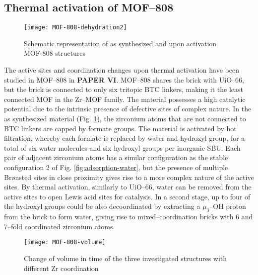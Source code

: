 \subsection*{Thermal activation of MOF--808}
\begin{figure}[!htbp]
	\centering
	\texttt{[image: MOF-808-dehydration2]}
	\caption{Schematic representation of as synthesized and upon activation MOF-808 structures}
	\label{fig:MOF-808-dehydration2}
\end{figure}
The active sites and coordination changes upon thermal activation have been studied in MOF--808 in \textbf{PAPER VI}. MOF--808 shares the  brick with UiO--66, but the brick is connected to only six tritopic BTC linkers, making it the least connected MOF in the Zr--MOF family. The material possesses a high catalytic potential due to the intrinsic presence of defective sites of complex nature. In the as synthesized material (Fig. \ref{fig:MOF-808-dehydration2}), the zirconium atoms that are not connected to BTC linkers are capped by formate groups. The material is activated by hot filtration, whereby each formate is replaced by water and hydroxyl group, for a total of six water molecules and six hydroxyl groups per inorganic SBU. Each pair of adjacent zirconium atoms has a similar configuration as the stable configuration 2 of Fig. \ref{fig:adsorption-water}, but the presence of multiple Br\o{}nsted sites in close proximity gives rise to a more complex nature of the active sites. By thermal activation, similarly to UiO--66, water can be removed from the active sites to open Lewis acid sites for catalysis. In a second stage, up to four of the hydroxyl groups could be also decoordinated by extracting a $\mu_3$--OH proton from the brick to form water, giving rise to mixed--coordination bricks with 6 and 7--fold coordinated zirconium atoms.
\npar
\begin{figure}[!htbp]
	\centering
	\texttt{[image: MOF-808-volume]}
	\caption{Change of volume in time of the three investigated structures with different Zr coordination}
	\label{fig:MOF-808-volume}
\end{figure}
